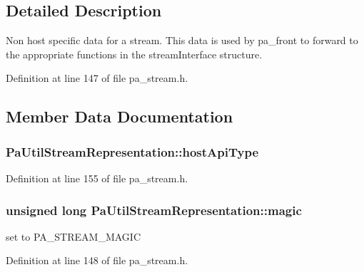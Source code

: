 \subsection{Detailed Description}
Non host specific data for a stream. This data is used by pa\+\_\+front to forward to the appropriate functions in the stream\+Interface structure. 

Definition at line 147 of file pa\+\_\+stream.\+h.



\subsection{Member Data Documentation}
\subsubsection[{\texorpdfstring{host\+Api\+Type}{hostApiType}}]{ Pa\+Util\+Stream\+Representation\+::host\+Api\+Type}\hypertarget{struct_pa_util_stream_representation_ad37d76303fc568156f4b9bd03beb5fce}{}\label{struct_pa_util_stream_representation_ad37d76303fc568156f4b9bd03beb5fce}


Definition at line 155 of file pa\+\_\+stream.\+h.

\subsubsection[{\texorpdfstring{magic}{magic}}]{\setlength{\rightskip}{0pt plus 5cm}unsigned long Pa\+Util\+Stream\+Representation\+::magic}\hypertarget{struct_pa_util_stream_representation_a6f317d637618d5d4fee13c11c65b8c4a}{}\label{struct_pa_util_stream_representation_a6f317d637618d5d4fee13c11c65b8c4a}
set to P\+A\+\_\+\+S\+T\+R\+E\+A\+M\+\_\+\+M\+A\+G\+IC 

Definition at line 148 of file pa\+\_\+stream.\+h.

